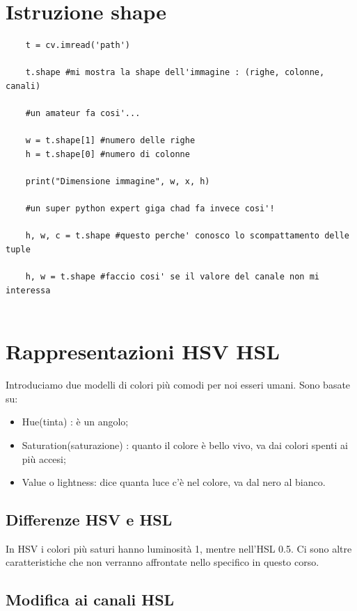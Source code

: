 \newpage

\section{Istruzione shape}

\begin{lstlisting}
	t = cv.imread('path')
	
	t.shape #mi mostra la shape dell'immagine : (righe, colonne, canali)
	
	#un amateur fa cosi'...
	
	w = t.shape[1] #numero delle righe
	h = t.shape[0] #numero di colonne
	
	print("Dimensione immagine", w, x, h)
	
	#un super python expert giga chad fa invece cosi'!
	
	h, w, c = t.shape #questo perche' conosco lo scompattamento delle tuple
	
	h, w = t.shape #faccio cosi' se il valore del canale non mi interessa
	
\end{lstlisting}

\section{Rappresentazioni HSV HSL}

Introduciamo due modelli di colori più comodi per noi esseri umani. Sono basate su:
\begin{itemize}
	\item Hue(tinta) : è un angolo;
	\item Saturation(saturazione) :  quanto il colore è bello vivo, va dai colori spenti ai più accesi;
	\item Value o lightness: dice quanta luce c'è nel colore, va dal nero al bianco.
\end{itemize}

\subsection{Differenze HSV e HSL}

In HSV i colori più saturi hanno luminosità 1, mentre nell'HSL 0.5. Ci sono altre caratteristiche che non verranno affrontate nello specifico in questo corso.

\subsection{Modifica ai canali HSL}

